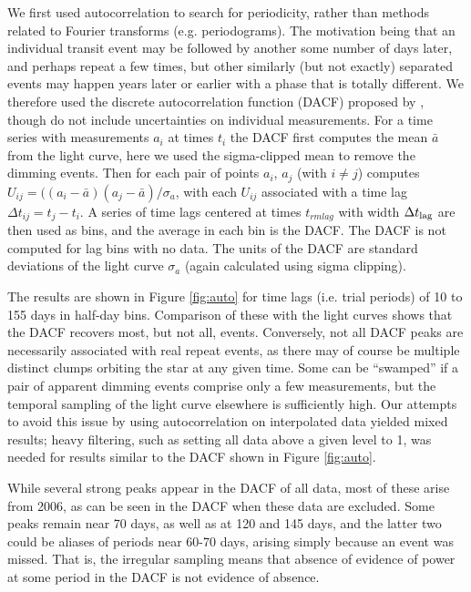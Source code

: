 \documentclass[]{rsos}
\begin{document}
We first used autocorrelation to search for periodicity, rather than methods related to
Fourier transforms (e.g. periodograms). The motivation being that an individual transit
event may be followed by another some number of days later, and perhaps repeat a few
times, but other similarly (but not exactly) separated events may happen years later or
earlier with a phase that is totally different. We therefore used the discrete
autocorrelation function (DACF) proposed by \cite{1988ApJ...333..646E}, though do not
include uncertainties on individual measurements. For a time series with measurements
$a_i$ at times $t_i$ the DACF first computes the mean $\bar{a}$ from the light curve,
here we used the sigma-clipped mean to remove the dimming events. Then for each pair of
points $a_i$, $a_j$ (with $i\ne j$) computes
$U_{ij}=((a_i-\bar{a})(a_j-\bar{a}) / \sigma_a$, with each $U_{ij}$ associated with a
time lag $\Delta t_{ij}=t_j - t_i$. A series of time lags centered at times $t_{rm lag}$
with width $\Delta t_{\rm lag}$ are then used as bins, and the average in each bin is the
DACF. The DACF is not computed for lag bins with no data. The units of the DACF are
standard deviations of the light curve $\sigma_a$ (again calculated using sigma
clipping).

The results are shown in Figure \ref{fig:auto} for time lags (i.e. trial periods) of 10
to 155 days in half-day bins. Comparison of these with the light curves shows that the
DACF recovers most, but not all, events. Conversely, not all DACF peaks are necessarily
associated with real repeat events, as there may of course be multiple distinct clumps
orbiting the star at any given time. Some can be ``swamped'' if a pair of apparent
dimming events comprise only a few measurements, but the temporal sampling of the light
curve elsewhere is sufficiently high. Our attempts to avoid this issue by using
autocorrelation on interpolated data yielded mixed results; heavy filtering, such as
setting all data above a given level to 1, was needed for results similar to the DACF
shown in Figure \ref{fig:auto}.

While several strong peaks appear in the DACF of all data, most of these arise from 2006,
as can be seen in the DACF when these data are excluded. Some peaks remain near 70 days,
as well as at 120 and 145 days, and the latter two could be aliases of periods near 60-70
days, arising simply because an event was missed. That is, the irregular sampling means
that absence of evidence of power at some period in the DACF is not evidence of absence.
\end{document}
